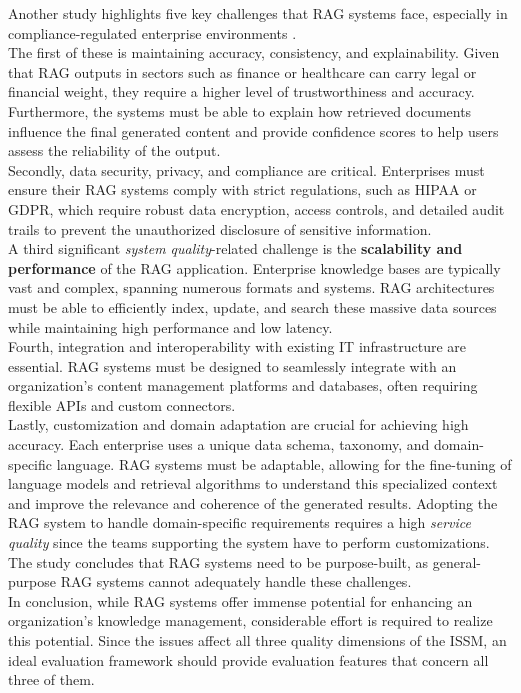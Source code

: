 \documentclass[
	english,
	ruledheaders=section,%
	class=report,%
	thesis={type=bachelor},%
	accentcolor=1b,%
	custommargins=true,%
	marginpar=false,%
	parskip=half-,%
	fontsize=11pt,%
	DIV=14,
]{tudapub}
\begin{document}
Another study highlights five key challenges that RAG systems face, especially in compliance-regulated enterprise environments \parencite{Bruckhaus2024RAG}.\\
The first of these is maintaining accuracy, consistency, and explainability. Given that RAG outputs in sectors such as finance or healthcare can carry legal or financial weight, they require a higher level of trustworthiness and accuracy. Furthermore, the systems must be able to explain how retrieved documents influence the final generated content and provide confidence scores to help users assess the reliability of the output.\\
Secondly, data security, privacy, and compliance are critical. Enterprises must ensure their RAG systems comply with strict regulations, such as HIPAA or GDPR, which require robust data encryption, access controls, and detailed audit trails to prevent the unauthorized disclosure of sensitive information.\\
A third significant \textit{system quality}-related challenge is the \textbf{scalability and performance} of the RAG application. Enterprise knowledge bases are typically vast and complex, spanning numerous formats and systems. RAG architectures must be able to efficiently index, update, and search these massive data sources while maintaining high performance and low latency.\\
Fourth, integration and interoperability with existing IT infrastructure are essential. RAG systems must be designed to seamlessly integrate with an organization's content management platforms and databases, often requiring flexible APIs and custom connectors.\\
Lastly, customization and domain adaptation are crucial for achieving high accuracy. Each enterprise uses a unique data schema, taxonomy, and domain-specific language. RAG systems must be adaptable, allowing for the fine-tuning of language models and retrieval algorithms to understand this specialized context and improve the relevance and coherence of the generated results. Adopting the RAG system to handle domain-specific requirements requires a high \textit{service quality} since the teams supporting the system have to perform customizations.\\
The study concludes that RAG systems need to be purpose-built, as general-purpose RAG systems cannot adequately handle these challenges.\\
In conclusion, while RAG systems offer immense potential for enhancing an organization's knowledge management, considerable effort is required to realize this potential. Since the issues affect all three quality dimensions of the ISSM, an ideal evaluation framework should provide evaluation features that concern all three of them.
\end{document}
